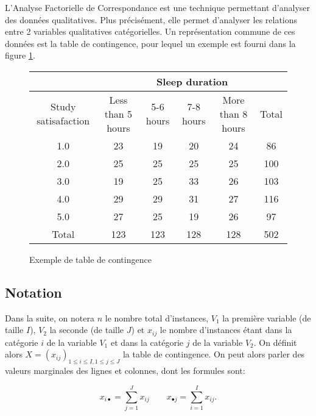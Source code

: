 L'Analyse Factorielle de Correspondance est une technique permettant d'analyser des données qualitatives. 
Plus précisément, elle permet d'analyser les relations entre 2 variables qualitatives catégorielles. Un représentation commune de ces données est la table de contingence, pour lequel un exemple est fourni dans la figure \ref{cont-table}. 

\begin{figure}[!h]
\begin{center}
  \begin{tabular}{| c | c | c | c | c | c |}
    \hline
    & \multicolumn{5}{|c|}{Sleep duration}\\
    \hline
    Study satisafaction & Less than 5 hours & 5-6 hours & 7-8 hours & More than 8 hours & Total\\
    \hline
    1.0 & 23 & 19 & 20 & 24 & 86 \\ 
    \hline 
    2.0 & 25 & 25 & 25 & 25 & 100\\ 
    \hline 
    3.0 & 19 & 25 & 33 & 26 & 103\\ 
    \hline 
    4.0 & 29 & 29 & 31 & 27 & 116\\ 
    \hline 
    5.0 & 27 & 25 & 19 & 26 & 97\\ 
    \hline
    Total & 123 & 123 & 128 & 128 & 502 \\ 
    \hline

  \end{tabular}
\end{center}
  \caption{Exemple de table de contingence}
  \label{cont-table}
\end{figure}

\subsection{Notation}

Dans la suite, on notera $n$ le nombre total d'instances, $V_1$ la première variable (de taille $I$), $V_2$ la seconde (de taille $J$) et $x_{ij}$ le nombre d'instances étant dans la catégorie $i$ de la variable $V_1$ et dans la catégorie $j$ de la variable $V_2$.
On définit alors $X = (x_{ij})_{1 \leq i \leq I, 1 \leq j \leq J}$ la table de contingence. On peut alors parler des valeurs marginales des lignes et colonnes, dont les formules sont:

\begin{equation}
  x_{i\bullet} = \sum_{j=1}^J x_{ij} \qquad 
  x_{\bullet j} = \sum_{i=1}^I x_{ij}.
\end{equation}

